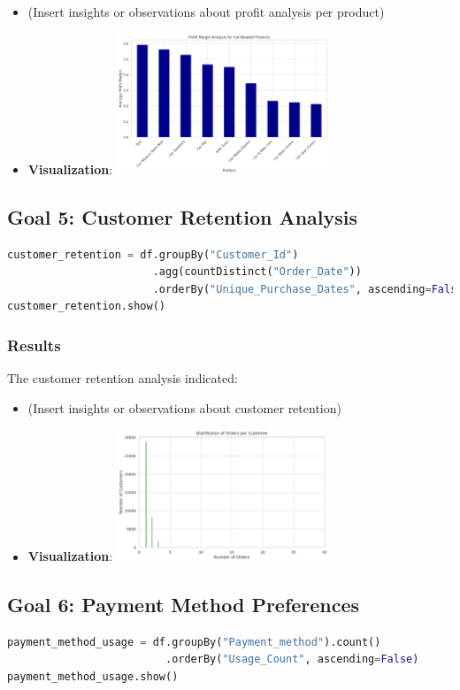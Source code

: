 \documentclass{article}
\begin{document}
\begin{itemize}
    \item (Insert insights or observations about profit analysis per product)
     \item \textbf{Visualization}: \includegraphics[width=0.5\textwidth]{goal4.jpeg}
\end{itemize}
\subsection{Goal 5: Customer Retention Analysis}
\begin{lstlisting}[language=Python, caption={Customer retention analysis}]
customer_retention = df.groupBy("Customer_Id")
                       .agg(countDistinct("Order_Date"))
                       .orderBy("Unique_Purchase_Dates", ascending=False)
customer_retention.show()
\end{lstlisting}
\subsubsection{Results}
The customer retention analysis indicated:

\begin{itemize}
    \item (Insert insights or observations about customer retention)
     \item \textbf{Visualization}: \includegraphics[width=0.5\textwidth]{goal5.jpeg}
\end{itemize}

\subsection{Goal 6: Payment Method Preferences}
\begin{lstlisting}[language=Python, caption={Payment method usage analysis}]
payment_method_usage = df.groupBy("Payment_method").count()
                         .orderBy("Usage_Count", ascending=False)
payment_method_usage.show()
\end{lstlisting}
\end{document}
